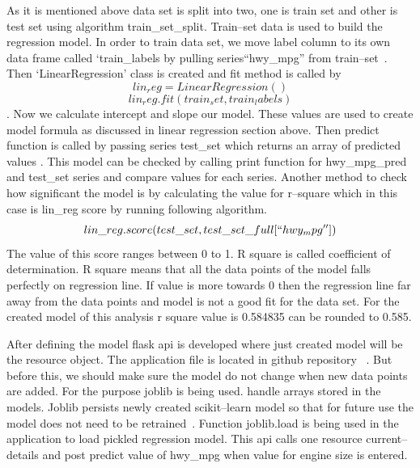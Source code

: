    As it is mentioned above data set is split into two, one is train
   set and other is test set using algorithm train\_set\_split. 
   Train--set data is used to build the regression
   model. In order to train data set, we move label column to its own data frame
   called `train\_labels by pulling  series``hwy\_mpg'' from 
   train--set~\cite{hid-sp18-415-regression}. Then `LinearRegression' 
   class is created and fit 
   method is called by \[lin_reg = LinearRegression()\] 
   \[lin_reg.fit(train_set, train_labels)\]. Now we calculate intercept and
  slope our model. These values are used to create model formula
  as discussed in linear regression section above. Then predict function is
  called  by passing series test\_set which returns an array of predicted 
  values \cite{regression}. This model can be checked by calling print function
  for hwy\_mpg\_pred
  and test\_set series and compare values for each series. Another method to
  check how significant the model is by calculating the value for r--square 
  which in this case is lin\_reg score by running following algorithm.  
  \[lin\_reg.score(test\_set, test\_set\_full[``hwy_mpg''])\]
  The value of this score ranges between 0 to 1. R square is called coefficient
  of determination. R square means that all the data points of the model falls
  perfectly on regression line. If value is more towards 0 then the regression 
  line far away from the data points and model is not a good fit for the data
  set. For the created model of this analysis r square value is 
  0.584835 can be rounded to 0.585.
  
  After defining the model flask api is developed where just created model will 
  be the resource object. The application file is located in github repository
  ~\cite{hid-sp-18-415-regresssionapi}. But before this,
   we should make sure the model do not 
  change when new data points are added. For the purpose joblib is being used.
  handle arrays stored in the models. Joblib persists newly created
  scikit--learn model so that for future use the model does not need to be
  retrained~\cite{hid-sp-18-415-joblib}. Function joblib.load is being used in
  the application to load pickled regression model. This api calls one resource 
  current--details  and post predict value of hwy\_mpg when value for engine
  size is entered. 
   
  
